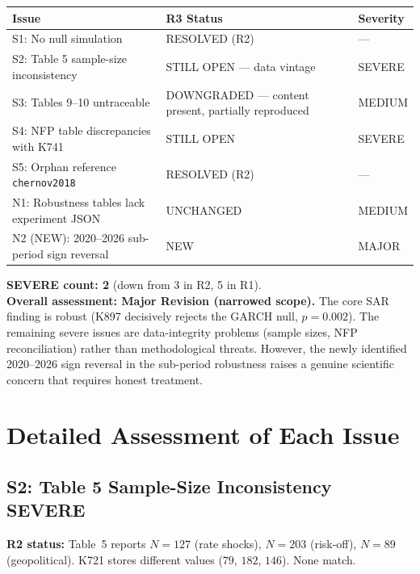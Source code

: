 \documentclass[12pt,a4paper]{article}
\begin{document}
\begin{tabular}{lll}
\toprule
\textbf{Issue} & \textbf{R3 Status} & \textbf{Severity} \\
\midrule
S1: No null simulation & \textcolor{okgreen}{RESOLVED (R2)} & --- \\
S2: Table 5 sample-size inconsistency & \textcolor{errorred}{STILL OPEN --- data vintage} & SEVERE \\
S3: Tables 9--10 untraceable & \textcolor{resolved}{DOWNGRADED --- content present, partially reproduced} & MEDIUM \\
S4: NFP table discrepancies with K741 & \textcolor{errorred}{STILL OPEN} & SEVERE \\
S5: Orphan reference \texttt{chernov2018} & \textcolor{okgreen}{RESOLVED (R2)} & --- \\
\addlinespace
N1: Robustness tables lack experiment JSON & \textcolor{warncolor}{UNCHANGED} & MEDIUM \\
N2 (NEW): 2020--2026 sub-period sign reversal & \textcolor{errorred}{NEW} & MAJOR \\
\bottomrule
\end{tabular}

\medskip

\noindent\textbf{SEVERE count: 2} (down from 3 in R2, 5 in R1).\\
\textbf{Overall assessment: Major Revision (narrowed scope).} The core SAR finding is robust (K897 decisively rejects the GARCH null, $p = 0.002$). The remaining severe issues are data-integrity problems (sample sizes, NFP reconciliation) rather than methodological threats. However, the newly identified 2020--2026 sign reversal in the sub-period robustness raises a genuine scientific concern that requires honest treatment.

\bigskip

\section*{Detailed Assessment of Each Issue}

\subsection*{S2: Table 5 Sample-Size Inconsistency \hfill \textcolor{errorred}{SEVERE}}

\textbf{R2 status:} Table~5 reports $N = 127$ (rate shocks), $N = 203$ (risk-off), $N = 89$ (geopolitical). K721 stores different values ($79$, $182$, $146$). None match.
\end{document}
